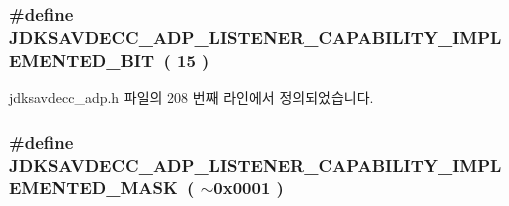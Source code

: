 \subsubsection[{\texorpdfstring{J\+D\+K\+S\+A\+V\+D\+E\+C\+C\+\_\+\+A\+D\+P\+\_\+\+L\+I\+S\+T\+E\+N\+E\+R\+\_\+\+C\+A\+P\+A\+B\+I\+L\+I\+T\+Y\+\_\+\+I\+M\+P\+L\+E\+M\+E\+N\+T\+E\+D\+\_\+\+B\+IT}{JDKSAVDECC_ADP_LISTENER_CAPABILITY_IMPLEMENTED_BIT}}]{\setlength{\rightskip}{0pt plus 5cm}\#define J\+D\+K\+S\+A\+V\+D\+E\+C\+C\+\_\+\+A\+D\+P\+\_\+\+L\+I\+S\+T\+E\+N\+E\+R\+\_\+\+C\+A\+P\+A\+B\+I\+L\+I\+T\+Y\+\_\+\+I\+M\+P\+L\+E\+M\+E\+N\+T\+E\+D\+\_\+\+B\+IT~( 15 )}\hypertarget{group__adp__listener__capability_gaeb6be6079a96fe1b38647afc8441fb52}{}\label{group__adp__listener__capability_gaeb6be6079a96fe1b38647afc8441fb52}


jdksavdecc\+\_\+adp.\+h 파일의 208 번째 라인에서 정의되었습니다.

\subsubsection[{\texorpdfstring{J\+D\+K\+S\+A\+V\+D\+E\+C\+C\+\_\+\+A\+D\+P\+\_\+\+L\+I\+S\+T\+E\+N\+E\+R\+\_\+\+C\+A\+P\+A\+B\+I\+L\+I\+T\+Y\+\_\+\+I\+M\+P\+L\+E\+M\+E\+N\+T\+E\+D\+\_\+\+M\+A\+SK}{JDKSAVDECC_ADP_LISTENER_CAPABILITY_IMPLEMENTED_MASK}}]{\setlength{\rightskip}{0pt plus 5cm}\#define J\+D\+K\+S\+A\+V\+D\+E\+C\+C\+\_\+\+A\+D\+P\+\_\+\+L\+I\+S\+T\+E\+N\+E\+R\+\_\+\+C\+A\+P\+A\+B\+I\+L\+I\+T\+Y\+\_\+\+I\+M\+P\+L\+E\+M\+E\+N\+T\+E\+D\+\_\+\+M\+A\+SK~( $\sim$0x0001 )}\hypertarget{group__adp__listener__capability_ga710ce83229a051afbbb2a89c4df01b9e}{}\label{group__adp__listener__capability_ga710ce83229a051afbbb2a89c4df01b9e}


